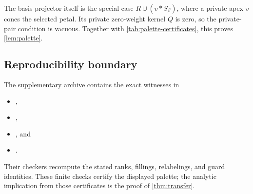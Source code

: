 The basis projector itself is the special case
\(R\cup(v*S_\beta)\), where a private apex \(v\) cones the selected petal.
Its private zero-weight kernel \(Q\) is zero, so the private-pair condition is
vacuous.  Together with \cref{tab:palette-certificates}, this proves
\cref{lem:palette}.

\subsection{Reproducibility boundary}

The supplementary archive contains the exact witnesses in
\begin{itemize}
\item {},
\item {},
\item {}, and
\item {}.
\end{itemize}
Their checkers recompute the stated ranks, fillings, relabelings, and guard
identities.  These finite checks certify the displayed palette; the analytic
implication from those certificates is the proof of \cref{thm:transfer}.
